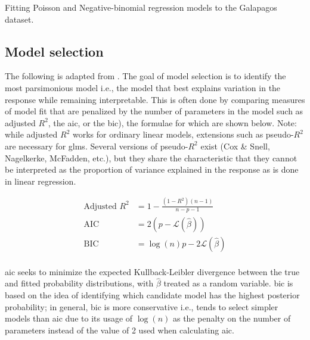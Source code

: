 \documentclass{report}
\begin{document}
\begin{listing}[h!]
\inputminted{r}{Example-Code/count_regression.R}
\caption{Fitting Poisson and Negative-binomial regression models to the Galapagos dataset.}
\label{listing:count-regression-example}
\end{listing}

\subsection{Model selection}

The following is adapted from \cite[Chapter~4.6]{agresti_foundations_2015}. The goal of model selection is to identify the most parsimonious model i.e., the model that best explains variation in the response while remaining interpretable. This is often done by comparing measures of model fit that are penalized by the number of parameters in the model such as adjusted $R^2$, the \gls{aic}, or the \gls{bic}), the formulae for which are shown below. Note: while adjusted $R^2$ works for ordinary linear models, extensions such as pseudo-$R^2$ are necessary for \glspl{glm}. Several versions of pseudo-$R^2$ exist (Cox \& Snell, Nagelkerke, McFadden, etc.), but they share the characteristic that they cannot be interpreted as the proportion of variance explained in the response as is done in linear regression. 

\begin{equation}\label{eq:glm-fit-measures}
    \begin{aligned}
        \text{Adjusted } R^2 &= 1 - \frac{(1 - R^2)(n-1)}{n - p - 1} \\
        \text{AIC} &= 2\left(p - \mathcal{L}\left(\hat{\beta}\right)\right) \\
        \text{BIC} &= \log(n)p - 2\mathcal{L}\left(\hat{\beta}\right) \\
    \end{aligned}
\end{equation}

\Gls{aic} seeks to minimize the expected Kullback-Leibler divergence between the true and fitted probability distributions, with $\hat{\beta}$ treated as a random variable. \Gls{bic} is based on the idea of identifying which candidate model has the highest posterior probability; in general, \gls{bic} is more conservative i.e., tends to select simpler models than \gls{aic} due to its usage of $\log(n)$ as the penalty on the number of parameters instead of the value of 2 used when calculating \gls{aic}. 
\end{document}
